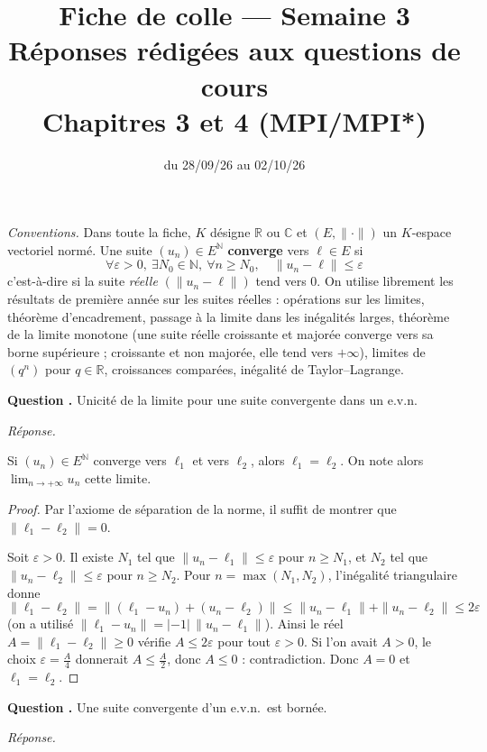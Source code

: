 \documentclass[11pt]{article}
\title{Fiche de colle --- Semaine 3\\ \large Réponses rédigées aux questions de cours\\ Chapitres 3 et 4 (MPI/MPI*)}
\author{}
\date{du 28/09/26 au 02/10/26}
\newcounter{qnum}
\newcommand{\question}[1]{%
\stepcounter{qnum}%
\bigskip
\noindent\textbf{Question \theqnum.} #1\par}
\newcommand{\reponse}{\noindent\textit{Réponse.}\ }
\begin{document}
\maketitle

\noindent\textit{Conventions.} Dans toute la fiche, $K$ désigne $\mathbb{R}$ ou $\mathbb{C}$ et $(E,\|\cdot\|)$ un $K$-espace vectoriel normé. Une suite $(u_n)\in E^{\mathbb{N}}$ \textbf{converge} vers $\ell\in E$ si
\[\forall\varepsilon>0,\ \exists N_0\in\mathbb{N},\ \forall n\geq N_0,\quad\|u_n-\ell\|\leq\varepsilon\]
c'est-à-dire si la suite \emph{réelle} $(\|u_n-\ell\|)$ tend vers $0$. On utilise librement les résultats de première année sur les suites réelles : opérations sur les limites, théorème d'encadrement, passage à la limite dans les inégalités larges, théorème de la limite monotone (une suite réelle croissante et majorée converge vers sa borne supérieure ; croissante et non majorée, elle tend vers $+\infty$), limites de $(q^n)$ pour $q\in\mathbb{R}$, croissances comparées, inégalité de Taylor--Lagrange.

\question{Unicité de la limite pour une suite convergente dans un e.v.n.}
\reponse

\begin{prop}
\label{prop:unicite-limite}
Si $(u_n)\in E^{\mathbb{N}}$ converge vers $\ell_1$ et vers $\ell_2$, alors $\ell_1=\ell_2$. On note alors $\lim_{n\to+\infty}u_n$ cette limite.
\end{prop}

\begin{proof}
Par l'axiome de séparation de la norme, il suffit de montrer que $\|\ell_1-\ell_2\|=0$.

Soit $\varepsilon>0$. Il existe $N_1$ tel que $\|u_n-\ell_1\|\leq\varepsilon$ pour $n\geq N_1$, et $N_2$ tel que $\|u_n-\ell_2\|\leq\varepsilon$ pour $n\geq N_2$. Pour $n=\max(N_1,N_2)$, l'inégalité triangulaire donne
\[\|\ell_1-\ell_2\|=\|(\ell_1-u_n)+(u_n-\ell_2)\|\leq\|u_n-\ell_1\|+\|u_n-\ell_2\|\leq 2\varepsilon\]
(on a utilisé $\|\ell_1-u_n\|=|-1|\,\|u_n-\ell_1\|$). Ainsi le réel $A=\|\ell_1-\ell_2\|\geq 0$ vérifie $A\leq 2\varepsilon$ pour tout $\varepsilon>0$. Si l'on avait $A>0$, le choix $\varepsilon=\frac A4$ donnerait $A\leq\frac A2$, donc $A\leq 0$ : contradiction. Donc $A=0$ et $\ell_1=\ell_2$.
\end{proof}

\question{Une suite convergente d'un e.v.n.\ est bornée.}
\reponse
\end{document}
